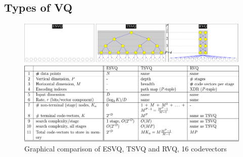 \subsection{Types of VQ}
\begin{figure}[htp]				
	\includegraphics[width=1.1\textwidth]{figs/RVQ_comparisonWithESVQ_TSVQ.pdf}
	\caption{Graphical comparison of ESVQ, TSVQ and RVQ, 16 codevectors}
	\label{fig:comparison_ESVQ_TSVQ_RVQ}
\end{figure}

